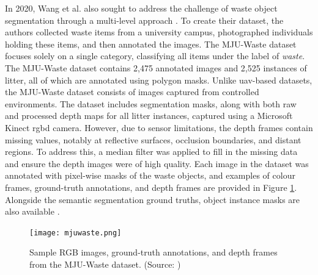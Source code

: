 In 2020, Wang et al. also sought to address the challenge of waste object segmentation through a multi-level approach \cite{mju_waste}. To create their dataset, the authors collected waste items from a university campus, photographed individuals holding these items, and then annotated the images. The MJU-Waste dataset focuses solely on a single category, classifying all items under the label of \textit{waste}. The MJU-Waste dataset contains 2,475 annotated images and 2,525 instances of litter, all of which are annotated using polygon masks.
Unlike \gls{uav}-based datasets, the MJU-Waste dataset consists of images captured from controlled environments. The dataset includes segmentation masks, along with both raw and processed depth maps for all litter instances, captured using a Microsoft Kinect \gls{rgbd} camera. However, due to sensor limitations, the depth frames contain missing values, notably at reflective surfaces, occlusion boundaries, and distant regions. To address this, a median filter was applied to fill in the missing data and ensure the depth images were of high quality. Each image in the dataset was annotated with pixel-wise masks of the waste objects, and examples of colour frames, ground-truth annotations, and depth frames are provided in Figure \ref{fig:mjuwaste}. Alongside the semantic segmentation ground truths, object instance masks are also available \cite{mju_waste}.

\begin{figure}[!htbp]
    \centering
    \texttt{[image: mjuwaste.png]}
    \caption{Sample RGB images, ground-truth annotations, and depth frames from the MJU-Waste dataset. (Source: \cite{mju_waste})}
    \label{fig:mjuwaste}
\end{figure}

